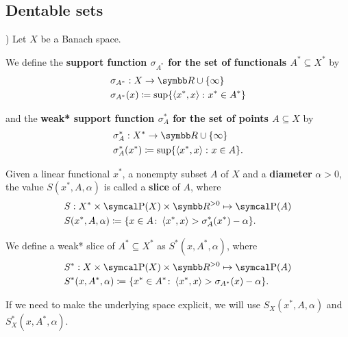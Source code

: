 \subsection{Dentable sets}\label{subsec:dentable_sets}

\begin{definition}\cite[example 3.2(a)]{Phelps1993})
  \label{def:banach_support_function}
  Let \( X \) be a Banach space.

  We define the \textbf{support function \( \sigma_{A^*} \) for the set of functionals \( A^* \subseteq X^* \)} by
  \begin{align*}
    &\sigma_{A^*}: X \to \BB{R} \cup \{ \infty \} \\
    &\sigma_{A^*}(x) \coloneqq \sup \{ \Prod {x^*} x \colon x^* \in A^* \}
  \end{align*}

  and the \textbf{weak* support function \( \sigma^*_A \) for the set of points \( A \subseteq X \)} by
  \begin{align*}
    &\sigma^*_A: X^* \to \BB{R} \cup \{ \infty \} \\
    &\sigma^*_A(x^*) \coloneqq \sup \{ \Prod {x^*} x \colon x \in A \}.
  \end{align*}
\end{definition}

\begin{definition}\cite[definition 2.17]{Phelps1993}
  \label{def:banach_slice}
  Given a linear functional \( x^* \), a nonempty subset \( A \) of \( X \) and a \textbf{diameter} \( \alpha > 0 \), the value \( S(x^*, A, \alpha) \) is called a \textbf{slice} of \( A \), where
  \begin{align*}
    &S: X^* \times \Power(X) \times \BB{R}^{>0} \mapsto \Power(A) \\
    &S(x^*, A, \alpha) \coloneqq \{ x \in A \colon \Prod {x^*} x > \sigma_A^*(x^*) - \alpha \}.
  \end{align*}

  We define a weak* slice of \( A^* \subseteq X^* \) as \( S^*(x, A^*, \alpha) \), where
  \begin{align*}
    &S^*: X \times \Power(X) \times \BB{R}^{>0} \mapsto \Power(A) \\
    &S^*(x, A^*, \alpha) \coloneqq \{ x^* \in A^* \colon \Prod {x^*} x > \sigma_{A^*}(x) - \alpha \}.
  \end{align*}

  If we need to make the underlying space explicit, we will use \( S_X(x^*, A, \alpha) \) and \( S_X^*(x, A^*, \alpha) \).
\end{definition}

